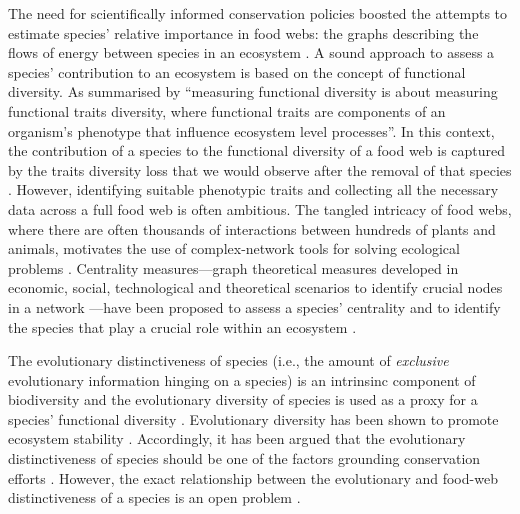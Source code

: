 \documentclass[12pt]{article}
\begin{document}
The need for scientifically informed conservation policies boosted the attempts
to estimate species' relative importance in food webs: the graphs describing
the flows of energy between species in an ecosystem \citep{may2009food}. A
sound approach to assess a species' contribution to an ecosystem is based on the
concept of functional diversity. As summarised by
\citet*[pg. 742]{petchey2006functional} ``measuring functional diversity is about
measuring functional traits diversity, where functional traits are components
of an organism's phenotype that influence ecosystem level processes''. In this
context, the contribution of a species to the functional diversity of a food
web is captured by the traits diversity loss that we would observe after the removal
of that species \citep{villeger2008new, fontana2015individual}. However,
identifying suitable phenotypic traits and collecting all the necessary
data across a full food web is often ambitious. The tangled intricacy of food
webs, where there are often thousands of interactions between hundreds of plants and
animals, motivates the use of complex-network tools for solving ecological problems
\citep{proulx2005network}. Centrality measures---graph theoretical measures
developed in economic, social, technological and theoretical scenarios to
identify crucial nodes in a network \citep{newman2010networks}---have been
proposed to assess a species' centrality and to identify the species that play a
crucial role within an ecosystem
\citep{estrada2007characterization,lai2012centrality}.

The evolutionary distinctiveness of species (i.e., the amount of
\emph{exclusive} evolutionary information hinging on a species) is an
intrinsinc component of biodiversity \citep{mace2003preserving} and the
evolutionary diversity of species is used as a proxy for a species' functional
diversity \citep{winter2013phylogenetic}. Evolutionary diversity has been shown
to promote ecosystem stability \citep{cadotte2012phylogenetic}. Accordingly, it
has been argued that the evolutionary distinctiveness of species should be one
of the factors grounding conservation efforts
\citep{faith1992conservation,redding2006incorporating,isaac2007mammals}.
However, the exact relationship between the evolutionary and food-web
distinctiveness of a species is an open problem
\citep{gerhold2015phylogenetic,miranda2015congruence}.
\end{document}
